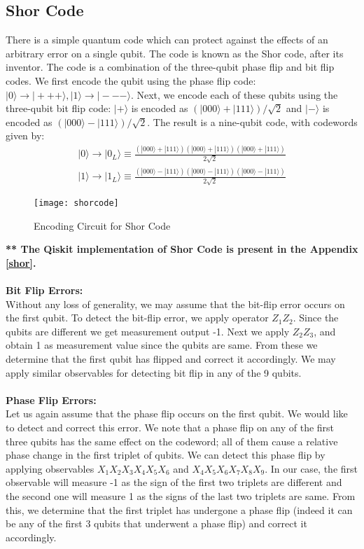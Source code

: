 \documentclass[12pt]{report}
\begin{document}
\subsection{Shor Code}
There is a simple quantum code which can protect against the effects of an arbitrary error on a single qubit. The code is known as the Shor code, after its inventor. The code is a combination of the three-qubit phase flip and bit flip codes. We first encode the qubit using the phase flip code: $|0\rangle \to |+++\rangle, |1\rangle \to |- - -\rangle$. Next, we encode each of these qubits using the three-qubit bit flip code: $|+\rangle$ is encoded as $(|000\rangle + |111\rangle)/\sqrt{2}$ and $|-\rangle$ is encoded as $(|000\rangle - |111\rangle)/\sqrt{2}$. The result is a nine-qubit code, with codewords given by: 
\begin{equation}
\begin{split}
|0\rangle \to |0_L\rangle \equiv \frac{(|000\rangle + |111\rangle)(|000\rangle + |111\rangle)(|000\rangle + |111\rangle)}{2\sqrt{2}}\\
|1\rangle \to |1_L\rangle \equiv \frac{(|000\rangle - |111\rangle)(|000\rangle - |111\rangle)(|000\rangle - |111\rangle)}{2\sqrt{2}}
\end{split}
\end{equation}
\begin{figure}[h]
\centering
\texttt{[image: shorcode]}
\caption{Encoding Circuit for Shor Code}
\label{fig:shorcode}
\end{figure}
\textbf{** The Qiskit implementation of Shor Code is present in the Appendix \ref{shor}.}\\
\\ \textbf{Bit Flip Errors:}\\
Without any loss of generality, we may assume that the bit-flip error occurs on the first qubit. To detect the bit-flip error, we apply operator $Z_1Z_2$. Since the qubits are different we get measurement output -1. Next we apply $Z_2Z_3$, and obtain 1 as measurement value since the qubits are same. From these we determine that the first qubit has flipped and correct it accordingly. We may apply similar observables for detecting bit flip in any of the 9 qubits. 
\\
\\
\textbf{Phase Flip Errors:}\\
Let us again assume that the phase flip occurs on the first qubit. We would like to detect and correct this error. We note that a phase flip on any of the first three qubits has the same effect on the codeword; all of them cause a relative phase change in the first triplet of qubits. We can detect this phase flip by applying observables $X_1X_2X_3X_4X_5X_6$ and $X_4X_5X_6X_7X_8X_9$. In our case, the first observable will measure -1 as the sign of the first two triplets are different and the second one will measure 1 as the signs of the last two triplets are same. From this, we determine that the first triplet has undergone a phase flip (indeed it can be any of the first 3 qubits that underwent a phase flip) and correct it accordingly. \\
\end{document}
